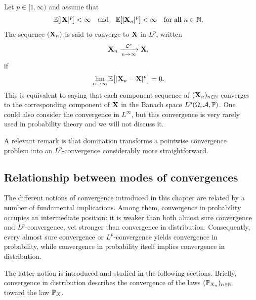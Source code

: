 \documentclass[../Main.tex]{subfiles}
\begin{document}
 {
Let $p\in[1,\infty)$ and assume that
\[\EE[|\bX|^p]<\infty\quad \text{and} \quad\EE[|\bX_n|^p]<\infty \quad \text{for all } n\in\NN.\]
The sequence $(\bX_n)$ is said to converge to $\bX$ in $L^p$, written
\[\bX_n \conv[\L^p]{n} \bX,\]
if
\[\lim_{n\to\infty}\EE\big[|\bX_n - \bX|^p\big]=0.\]}
This is equivalent to saying that each component sequence of $(\bX_n)_{n \in \NN}$ converges to the corresponding component of $\bX$ in the Banach space $L^p(\Omega,\A,\PP)$. One could also consider the convergence in $L^\infty$, but this convergence is very rarely used in probability theory and we will not discuss it.

A relevant remark is that domination transforms a pointwise convergence problem into an \(L^p\)-convergence considerably more straightforward.

\subsection{Relationship between modes of convergences }
The different notions of convergence introduced in this chapter are related by a number of fundamental implications. Among them, convergence in probability occupies an intermediate position: it is weaker than both almost sure convergence and $L^p$-convergence, yet stronger than convergence in distribution. Consequently, every almost sure convergence or $L^p$-convergence yields convergence in probability, while convergence in probability itself implies convergence in distribution.

The latter notion is introduced and studied in the following sections. Briefly, convergence in distribution describes the convergence of the laws $(\PP_{X_n})_{n\in\NN}$ toward the law $\PP_X$.
\end{document}
